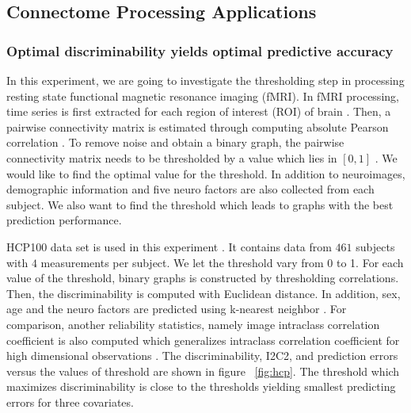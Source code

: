 \documentclass{article}
\begin{document}
\subsection{Connectome Processing Applications}

\subsubsection{Optimal discriminability yields optimal predictive accuracy}
In this experiment, we are going to investigate the thresholding step in processing resting state functional magnetic resonance imaging (fMRI). In fMRI processing, time series is first extracted for each region of interest (ROI) of brain \cite{strother2006evaluating}. Then, a pairwise connectivity matrix is estimated through computing absolute Pearson correlation \cite{liang2012effects}. To remove noise and obtain a binary graph, the pairwise connectivity matrix needs to be thresholded by a value which lies in $[0,1]$ \cite{hampson2002detection}\cite{van2010exploring}. We would like to find the optimal value for the threshold. In addition to neuroimages, demographic information and five neuro factors \cite{costa1992revised} are also collected from each subject. We also want to find the threshold which leads to graphs with the best prediction performance.  

HCP100 data set is used in this experiment \cite{van2012human}. It contains data from $461$ subjects with $4$ measurements per subject. We let the threshold vary from 0 to 1. For each value of the threshold, binary graphs is constructed by thresholding correlations. Then, the discriminability is computed with Euclidean distance. In addition, sex, age and the neuro factors are predicted using k-nearest neighbor \cite{vapnik1998statistical}. For comparison, another reliability statistics, namely image intraclass correlation coefficient is also computed which generalizes intraclass correlation coefficient for high dimensional observations \cite{shou2013quantifying}. The discriminability, I2C2, and prediction errors versus the values of threshold are shown in figure ~\ref{fig:hcp}. The threshold which maximizes discriminability is close to the thresholds yielding smallest predicting errors for three covariates. 
\end{document}
